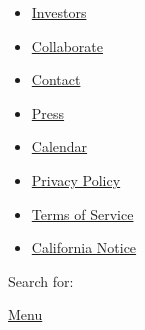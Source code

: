 \begin{itemize}
\tightlist
\item
  \href{http://www.nytco.com/investors/investor-relations/}{Investors}
\item
  \href{https://www.nytco.com/collaborate/}{Collaborate}
\item
  \href{https://www.nytco.com/contact/}{Contact}
\item
  \href{https://www.nytco.com/press/}{Press}
\item
  \href{https://www.nytco.com/events/}{Calendar}
\item
  \href{https://help.nytimes.com/hc/en-us/articles/115014892108-Privacy-policy}{Privacy
  Policy}
\item
  \href{https://help.nytimes.com/hc/en-us/articles/115014893428-Terms-of-service}{Terms
  of Service}
\item
  \href{http://www.nytimes.com/privacy/california-notice}{California
  Notice}
\end{itemize}

Search for:

\protect\hyperlink{}{Menu}
